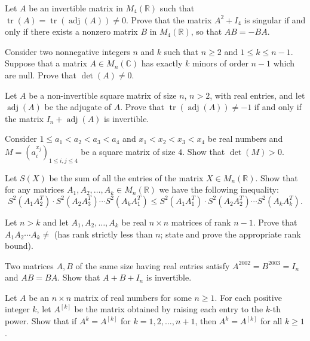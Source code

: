 \documentclass[12pt]{article}
\begin{document}
\begin{problem}
Let $A$ be an invertible matrix in $M_4(\mathbb{R})$ such that $\operatorname{tr}(A)=\operatorname{tr}(\operatorname{adj}(A))\ne 0$. Prove that the matrix $A^2+I_4$ is singular if and only if there exists a nonzero matrix $B$ in $M_4(\mathbb{R})$, so that $AB=-BA$.
\end{problem}

\begin{problem}
Consider two nonnegative integers $n$ and $k$ such that $n\ge 2$ and $1\le k\le n-1$. Suppose that a matrix $A\in M_n(\mathbb{C})$ has exactly $k$ minors of order $n-1$ which are null. Prove that $\det(A)\ne 0$.
\end{problem}

\begin{problem}
Let $A$ be a non-invertible square matrix of size $n$, $n>2$, with real entries, and let $\operatorname{adj}(A)$ be the adjugate of $A$. Prove that $\operatorname{tr}(\operatorname{adj}(A)) \ne -1$ if and only if the matrix $I_n+\operatorname{adj}(A)$ is invertible.
\end{problem}

\begin{problem}
Consider $1\le a_1<a_2<a_3<a_4$ and $x_1<x_2<x_3<x_4$ be real numbers and $M = (a_i^{x_j})_{1\le i,j\le 4}$ be a square matrix of size $4$. Show that $\det(M)>0$.
\end{problem}

\begin{problem}
Let $S(X)$ be the sum of all the entries of the matrix $X\in M_n(\mathbb{R})$. Show that for any matrices $A_1,A_2,\dots,A_k\in M_n(\mathbb{R})$ we have the following inequality:
\[
S^2(A_1A_2^T)\cdot S^2(A_2A_3^T) \cdots S^2(A_kA_1^T) \le S^2(A_1A_1^T)\cdot S^2(A_2A_2^T)\cdots S^2(A_kA_k^T).
\]
\end{problem}

\begin{problem}
Let $n>k$ and let $A_1,A_2,\dots,A_k$ be real $n\times n$ matrices of rank $n-1$. Prove that $A_1A_2\cdots A_k \ne$ (has rank strictly less than $n$; state and prove the appropriate rank bound).
\end{problem}

\begin{problem}
Two matrices $A,B$ of the same size having real entries satisfy $A^{2002}=B^{2003}=I_n$ and $AB=BA$. Show that $A+B+I_n$ is invertible.
\end{problem}

\begin{problem}
Let $A$ be an $n\times n$ matrix of real numbers for some $n\ge 1$. For each positive integer $k$, let $A^{[k]}$ be the matrix obtained by raising each entry to the $k$-th power. Show that if $A^k=A^{[k]}$ for $k=1,2,\dots,n+1$, then $A^k=A^{[k]}$ for all $k\ge 1$.
\end{problem}
\end{document}

